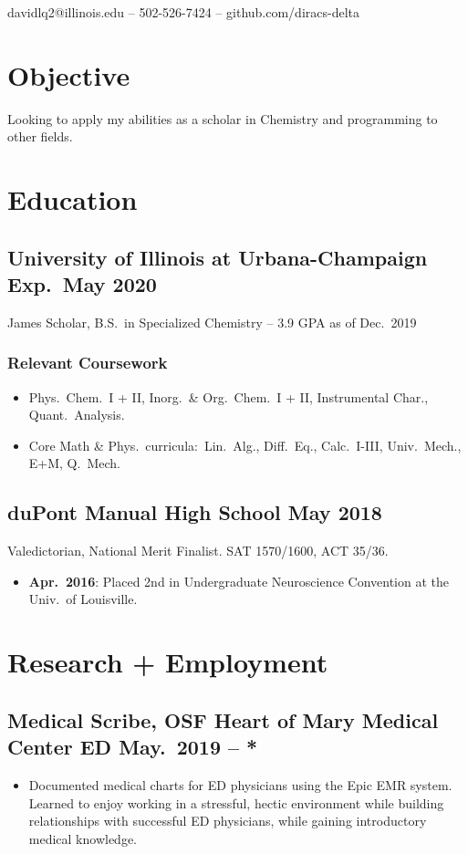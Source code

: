 \documentclass{article}
\makeatletter
\renewcommand{\maketitle}
{
	\begin{center}
	{\huge\bfseries\theauthor}

	\vspace{0.5em}
	davidlq2@illinois.edu -- 502-526-7424 -- github.com/diracs-delta
	\end{center}
}
\makeatother
\begin{document}
\author{David Qiu}
\maketitle

\section{Objective}
Looking to apply my abilities as a scholar in Chemistry and programming to other
fields.

\section{Education}
\subsection{University of Illinois at Urbana-Champaign \hfill Exp.\ May 2020}
James Scholar, B.S.\ in Specialized Chemistry -- 3.9 GPA as of Dec.\ 2019
\subsubsection{Relevant Coursework}
\begin{itemize}[noitemsep,nolistsep]
	\item Phys.\ Chem.\ I + II, Inorg.\ \& Org.\ Chem.\ I + II, Instrumental
	Char., Quant.\ Analysis.

	\item Core Math \& Phys.\ curricula:\ Lin.\ Alg., Diff.\ Eq., Calc.\
	I-III, Univ.\ Mech., E+M, Q.\ Mech.
\end{itemize}
\subsection{duPont Manual High School \hfill May 2018}
Valedictorian, National Merit Finalist. SAT 1570/1600, ACT 35/36.
\begin{itemize}[noitemsep,nolistsep]
	\item\textbf{Apr.\ 2016}: Placed 2nd in Undergraduate Neuroscience
	Convention at the Univ.\ of Louisville.
\end{itemize}

\section{Research + Employment}
\subsection{Medical Scribe, OSF Heart of Mary Medical Center ED
	    \hfill May.\ 2019 -- *}
\begin{itemize}[noitemsep,nolistsep]
	\item Documented medical charts for ED physicians using the Epic EMR
	system. Learned to enjoy working in a stressful, hectic environment
	while building relationships with successful ED physicians, while
	gaining introductory medical knowledge.
\end{itemize}
\end{document}
